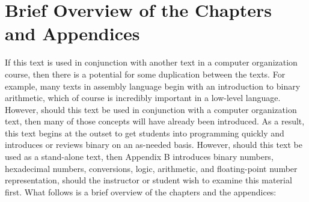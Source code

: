 \documentclass[10pt]{book}
\begin{document}
\section{Brief Overview of the Chapters and Appendices}
If this text is used in conjunction with another text in a computer organization course, then there is a potential for some duplication between the texts. For example, many texts in assembly language begin with an introduction to binary arithmetic, which of course is incredibly important in a low-level language. However, should this text be used in conjunction with a computer organization text, then many of those concepts will have already been introduced. As a result, this text begins at the outset to get students into programming quickly and introduces or reviews binary on an as-needed basis. However, should this text be used as a stand-alone text, then Appendix B introduces binary numbers, hexadecimal numbers, conversions, logic, arithmetic, and floating-point number representation, should the instructor or student wish to examine this material first. What follows is a brief overview of the chapters and the appendices:
\end{document}
